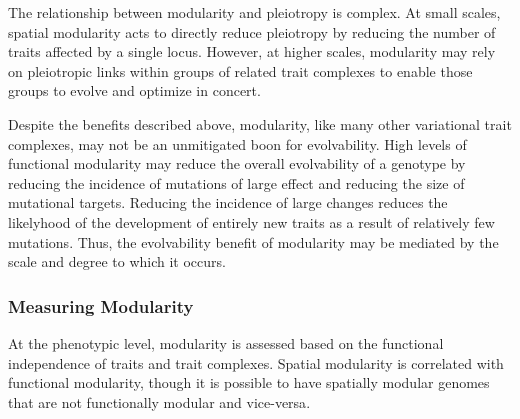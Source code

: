 \documentclass[PhD]{msu-thesis}
\begin{document}
The relationship between modularity and pleiotropy is complex. At small scales, spatial modularity acts to directly reduce pleiotropy by reducing the number of traits affected by a single locus\cite{misevic_sexual_2006}. However, at higher scales, modularity may rely on pleiotropic links within groups of related trait complexes to enable those groups to evolve and optimize in concert\cite{gunter_p._wagner_pleiotropic_2011}. 

Despite the benefits described above, modularity, like many other variational trait complexes, may not be an unmitigated boon for evolvability. High levels of functional modularity may reduce the overall evolvability of a genotype by reducing the incidence of mutations of large effect and reducing the size of mutational targets\cite{hansen_is_2003}. Reducing the incidence of large changes reduces the likelyhood of the development of entirely new traits as a result of relatively few mutations. Thus, the evolvability benefit of modularity may be mediated by the scale and degree to which it occurs.


\subsubsection{Measuring Modularity}
At the phenotypic level, modularity is assessed based on the functional independence of traits and trait complexes. Spatial modularity is correlated with functional modularity, though it is possible to have spatially modular genomes that are not functionally modular and vice-versa\cite{pavlicev_model_2012,mezey_is_2000}.  
\end{document}

